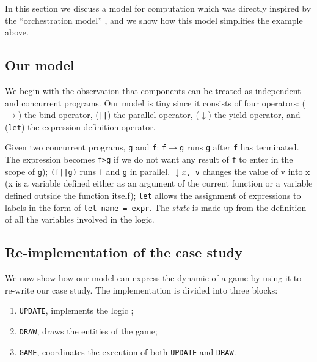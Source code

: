 In this section we discuss a model for computation which was directly inspired by the ``orchestration model'' \cite{misra2007computation}, and we show how this model simplifies the example above.

\subsection{Our model}
We begin with the observation that components can be treated as independent and concurrent programs.
Our model is tiny since it consists of four operators:  (\texttt{$\rightarrow$}) the bind operator, (\texttt{||}) the parallel operator, (\texttt{$\downarrow$}) the yield operator, and (\texttt{let}) the expression definition operator.

Given two concurrent programs, \texttt{g} and \texttt{f}: \texttt{f$\rightarrow$g} runs \texttt{g} after \texttt{f} has terminated. The expression becomes \texttt{f>g} if we do not want any result of \texttt{f} to enter in the scope of \texttt{g}); \texttt{(f||g)} runs \texttt{f} and \texttt{g} in parallel. \texttt{$\downarrow x$, v} changes the value of v into x (x is a variable defined either as an argument of the current function or a variable defined outside the function itself); \texttt{let} allows the assignment of expressions to labels in the form of \texttt{let name = expr}. The \textit{state} is made up from the definition of all the variables involved in the logic.


\subsection{Re-implementation of the case study}
We now show how our model can express the dynamic of a game by using it to re-write our case study. 
The implementation is divided into three blocks:
\begin{enumerate}
\item \texttt{UPDATE}, implements the logic ;
\item \texttt{DRAW}, draws the entities of the game; 
\item \texttt{GAME}, coordinates the execution of both \texttt{UPDATE} and \texttt{DRAW}.
\end{enumerate}

